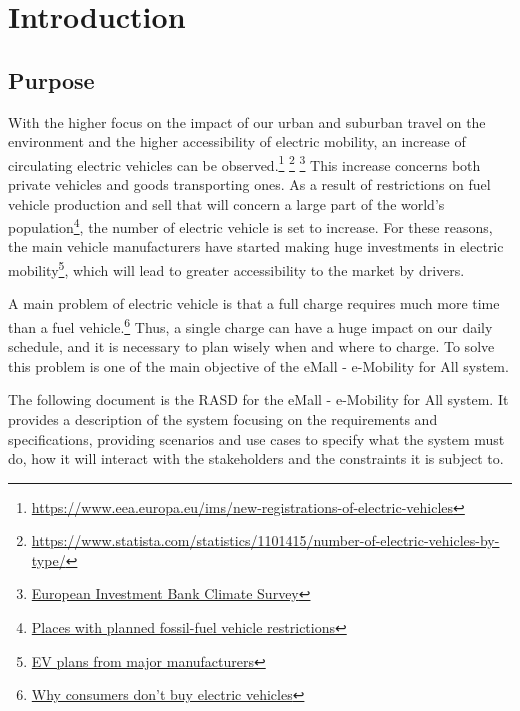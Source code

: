 \section{Introduction}\label{intro}

\subsection{Purpose}
With the higher focus on the impact of our urban and suburban travel on the environment and the higher accessibility of electric mobility, an increase of circulating electric vehicles can be observed.\footnote{\url{https://www.eea.europa.eu/ims/new-registrations-of-electric-vehicles}} \footnote{\url{https://www.statista.com/statistics/1101415/number-of-electric-vehicles-by-type/}} \footnote{\href{https://www.eib.org/en/surveys/climate-survey/4th-climate-survey/hybrid-electric-petrol-cars-flying-holidays-climate.htm}{European Investment Bank Climate Survey}}
This increase concerns both private vehicles and goods transporting ones.
As a result of restrictions on fuel vehicle production and sell that will concern a large part of the world's population\footnote{\href{https://en.wikipedia.org/wiki/Phase-out\_of\_fossil\_fuel\_vehicles\#Places\_with\_planned\_fossil-fuel\_vehicle\_restrictions}{Places with planned fossil-fuel vehicle restrictions}}, the number of
electric vehicle is set to increase. For these reasons, the main vehicle manufacturers have started making huge investments in electric mobility\footnote{\href{https://en.wikipedia.org/wiki/Electric\_car\#EV\_plans\_from\_major\_manufacturers}{EV plans from major manufacturers}}, which will lead to greater accessibility to the market by drivers.
\hfill \break

A main problem of electric vehicle is that a full charge requires much more time than a fuel vehicle.\footnote{\href{https://blinkcharging.com/fact-from-fiction-the-real-reason-why-consumers-dont-buy-electric-vehicles/?locale=en}{Why consumers don't buy electric vehicles}}
Thus, a single charge can have a huge impact on our daily schedule, and it is necessary to plan wisely when and where to charge.
To solve this problem is one of the main objective of the eMall - e-Mobility for All system.
\hfill \break

The following document is the RASD for the eMall - e-Mobility for All system. It provides
a description of the system focusing on the requirements and specifications, providing scenarios and use cases
to specify what the system must do, how it will interact with the stakeholders and the constraints it is subject to.

